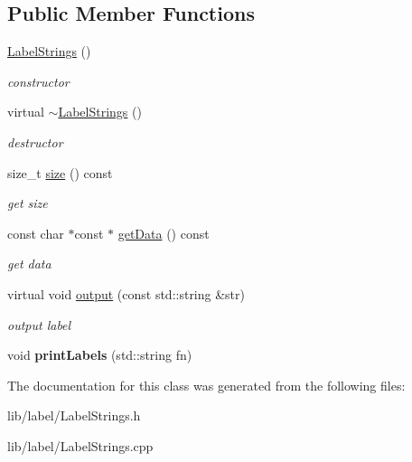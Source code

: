 \subsection*{\-Public \-Member \-Functions}
\begin{DoxyCompactItemize}
\item 
\hypertarget{classsinsy_1_1LabelStrings_a2fa90f22323d9432cc52626998861954}{\hyperlink{classsinsy_1_1LabelStrings_a2fa90f22323d9432cc52626998861954}{\-Label\-Strings} ()}\label{classsinsy_1_1LabelStrings_a2fa90f22323d9432cc52626998861954}

\begin{DoxyCompactList}\small\item\em constructor \end{DoxyCompactList}\item 
\hypertarget{classsinsy_1_1LabelStrings_a58f7cdd90cf82767508bdf6b25f24805}{virtual \hyperlink{classsinsy_1_1LabelStrings_a58f7cdd90cf82767508bdf6b25f24805}{$\sim$\-Label\-Strings} ()}\label{classsinsy_1_1LabelStrings_a58f7cdd90cf82767508bdf6b25f24805}

\begin{DoxyCompactList}\small\item\em destructor \end{DoxyCompactList}\item 
\hypertarget{classsinsy_1_1LabelStrings_a2269c6943a38c588352963ba7fa6de00}{size\-\_\-t \hyperlink{classsinsy_1_1LabelStrings_a2269c6943a38c588352963ba7fa6de00}{size} () const }\label{classsinsy_1_1LabelStrings_a2269c6943a38c588352963ba7fa6de00}

\begin{DoxyCompactList}\small\item\em get size \end{DoxyCompactList}\item 
\hypertarget{classsinsy_1_1LabelStrings_ae708611dbb4a3fff181a5af6e1723445}{const char $\ast$const $\ast$ \hyperlink{classsinsy_1_1LabelStrings_ae708611dbb4a3fff181a5af6e1723445}{get\-Data} () const }\label{classsinsy_1_1LabelStrings_ae708611dbb4a3fff181a5af6e1723445}

\begin{DoxyCompactList}\small\item\em get data \end{DoxyCompactList}\item 
\hypertarget{classsinsy_1_1LabelStrings_a75d7ede96c667305e7bf40c82d63812a}{virtual void \hyperlink{classsinsy_1_1LabelStrings_a75d7ede96c667305e7bf40c82d63812a}{output} (const std\-::string \&str)}\label{classsinsy_1_1LabelStrings_a75d7ede96c667305e7bf40c82d63812a}

\begin{DoxyCompactList}\small\item\em output label \end{DoxyCompactList}\item 
\hypertarget{classsinsy_1_1LabelStrings_a218e781ed11aa690a11499fd626b077c}{void {\bfseries print\-Labels} (std\-::string fn)}\label{classsinsy_1_1LabelStrings_a218e781ed11aa690a11499fd626b077c}

\end{DoxyCompactItemize}


\-The documentation for this class was generated from the following files\-:\begin{DoxyCompactItemize}
\item 
lib/label/\-Label\-Strings.\-h\item 
lib/label/\-Label\-Strings.\-cpp\end{DoxyCompactItemize}
